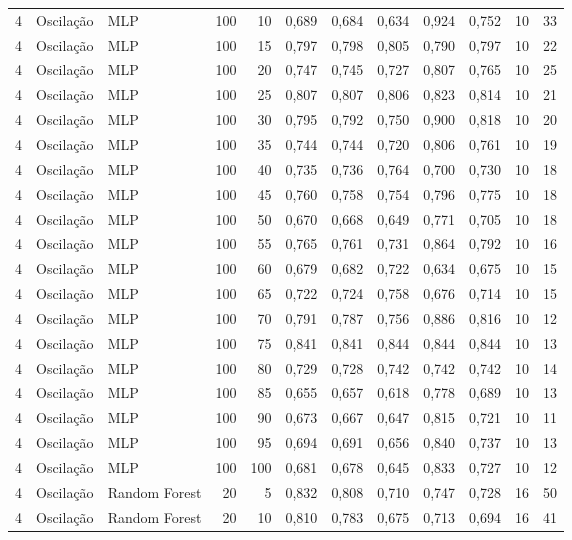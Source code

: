 \begin{longtable}{@{}rllrrrrrrrrr@{}}
4 & Oscilação & MLP & 100 & 10 & 0,689 & 0,684 & 0,634 & 0,924 & 0,752 & 10 & 33 \\
4 & Oscilação & MLP & 100 & 15 & 0,797 & 0,798 & 0,805 & 0,790 & 0,797 & 10 & 22 \\
4 & Oscilação & MLP & 100 & 20 & 0,747 & 0,745 & 0,727 & 0,807 & 0,765 & 10 & 25 \\
4 & Oscilação & MLP & 100 & 25 & 0,807 & 0,807 & 0,806 & 0,823 & 0,814 & 10 & 21 \\
4 & Oscilação & MLP & 100 & 30 & 0,795 & 0,792 & 0,750 & 0,900 & 0,818 & 10 & 20 \\
4 & Oscilação & MLP & 100 & 35 & 0,744 & 0,744 & 0,720 & 0,806 & 0,761 & 10 & 19 \\
4 & Oscilação & MLP & 100 & 40 & 0,735 & 0,736 & 0,764 & 0,700 & 0,730 & 10 & 18 \\
4 & Oscilação & MLP & 100 & 45 & 0,760 & 0,758 & 0,754 & 0,796 & 0,775 & 10 & 18 \\
4 & Oscilação & MLP & 100 & 50 & 0,670 & 0,668 & 0,649 & 0,771 & 0,705 & 10 & 18 \\
4 & Oscilação & MLP & 100 & 55 & 0,765 & 0,761 & 0,731 & 0,864 & 0,792 & 10 & 16 \\
4 & Oscilação & MLP & 100 & 60 & 0,679 & 0,682 & 0,722 & 0,634 & 0,675 & 10 & 15 \\
4 & Oscilação & MLP & 100 & 65 & 0,722 & 0,724 & 0,758 & 0,676 & 0,714 & 10 & 15 \\
4 & Oscilação & MLP & 100 & 70 & 0,791 & 0,787 & 0,756 & 0,886 & 0,816 & 10 & 12 \\
4 & Oscilação & MLP & 100 & 75 & 0,841 & 0,841 & 0,844 & 0,844 & 0,844 & 10 & 13 \\
4 & Oscilação & MLP & 100 & 80 & 0,729 & 0,728 & 0,742 & 0,742 & 0,742 & 10 & 14 \\
4 & Oscilação & MLP & 100 & 85 & 0,655 & 0,657 & 0,618 & 0,778 & 0,689 & 10 & 13 \\
4 & Oscilação & MLP & 100 & 90 & 0,673 & 0,667 & 0,647 & 0,815 & 0,721 & 10 & 11 \\
4 & Oscilação & MLP & 100 & 95 & 0,694 & 0,691 & 0,656 & 0,840 & 0,737 & 10 & 13 \\
4 & Oscilação & MLP & 100 & 100 & 0,681 & 0,678 & 0,645 & 0,833 & 0,727 & 10 & 12 \\
4 & Oscilação & Random Forest & 20 & 5 & 0,832 & 0,808 & 0,710 & 0,747 & 0,728 & 16 & 50 \\
4 & Oscilação & Random Forest & 20 & 10 & 0,810 & 0,783 & 0,675 & 0,713 & 0,694 & 16 & 41 \\

\end{longtable}
